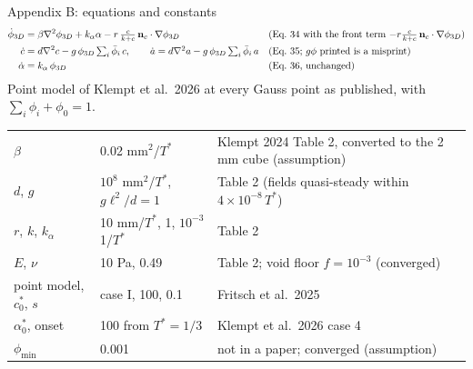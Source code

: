 \documentclass[aspectratio=169,11pt]{beamer}
\newcommand{\fterm}{\ensuremath{-r\tfrac{c}{k+c}\,\mathbf n_c\cdot\nabla \phi_{3D}}}
\begin{document}
\begin{frame}{Appendix B: equations and constants}
\small
\begin{align*}
\dot\phi_{3D}&=\beta\nabla^2\phi_{3D}+k_\alpha\alpha-r\,\tfrac{c}{k+c}\,\mathbf n_c\cdot\nabla\phi_{3D}
  &&\text{(Eq.\ 34 with the front term \fterm{})}\\
\dot c&=d\nabla^2c-g\,\phi_{3D}\textstyle\sum_i\bar\phi_i\,c,\qquad
\dot a=d\nabla^2a-g\,\phi_{3D}\textstyle\sum_i\bar\phi_i\,a &&\text{(Eq.\ 35; $g\phi$ printed is a misprint)}\\
\dot\alpha&=k_\alpha\,\phi_{3D} &&\text{(Eq.\ 36, unchanged)}
\end{align*}
Point model of Klempt et al.\ 2026 at every Gauss point as published, with $\sum_i\phi_i+\phi_0=1$.

\vspace{2pt}\footnotesize
\begin{tabular}{lll}
\toprule
$\beta$ & 0.02 mm$^2$/$T^*$ & Klempt 2024 Table 2, converted to the 2 mm cube (assumption)\\
$d$, $g$ & $10^8$ mm$^2$/$T^*$, $g\ell^2/d=1$ & Table 2 (fields quasi-steady within $4\times10^{-8}\,T^*$)\\
$r$, $k$, $k_\alpha$ & 10 mm/$T^*$, 1, $10^{-3}$ 1/$T^*$ & Table 2\\
$E$, $\nu$ & 10 Pa, 0.49 & Table 2; void floor $f=10^{-3}$ (converged)\\
point model, $c^*_0$, $s$ & case I, 100, 0.1 & Fritsch et al.\ 2025\\
$\alpha^*_0$, onset & 100 from $T^*=1/3$ & Klempt et al.\ 2026 case 4\\
$\phi_{\min}$ & 0.001 & not in a paper; converged (assumption)\\
\bottomrule
\end{tabular}
\end{frame}
\end{document}
